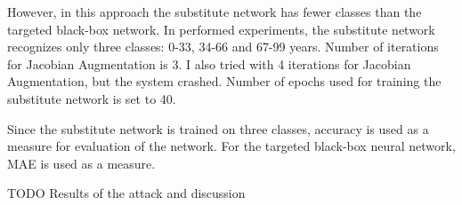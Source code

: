 However, in this approach the substitute network has fewer classes than the targeted black-box network. In performed experiments, the substitute network recognizes only three classes: 0-33, 34-66 and 67-99 years. Number of iterations for Jacobian Augmentation is 3. I also tried with 4 iterations for Jacobian Augmentation, but the system crashed. Number of epochs used for training the substitute network is set to 40.

Since the substitute network is trained on three classes, accuracy is used as a measure for evaluation of the network. For the targeted black-box neural network, MAE is used as a measure.

TODO Results of the attack and discussion


